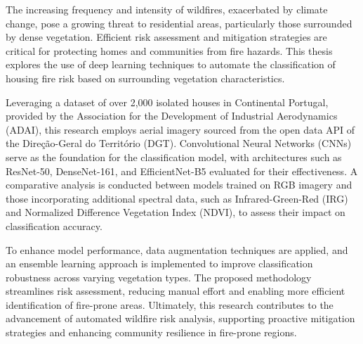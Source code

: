 
%
The increasing frequency and intensity of wildfires, exacerbated by climate change, 
pose a growing threat to residential areas, particularly those surrounded by 
dense vegetation. Efficient risk assessment and mitigation strategies are critical 
for protecting homes and communities from fire hazards. This thesis explores the 
use of deep learning techniques to automate the classification of housing fire 
risk based on surrounding vegetation characteristics.

Leveraging a dataset of over 2,000 isolated houses in Continental Portugal, 
provided by the Association for the Development of Industrial Aerodynamics 
(ADAI), this research employs aerial imagery sourced from the open data API 
of the Direção-Geral do Território (DGT). Convolutional Neural Networks (CNNs) 
serve as the foundation for the classification model, with architectures such as 
ResNet-50, DenseNet-161, and EfficientNet-B5 evaluated for their effectiveness. 
A comparative analysis is conducted between models trained on RGB imagery and 
those incorporating additional spectral data, such as Infrared-Green-Red (IRG) 
and Normalized Difference Vegetation Index (NDVI), to assess their impact on 
classification accuracy.

To enhance model performance, data augmentation techniques are applied, and an 
ensemble learning approach is implemented to improve classification robustness 
across varying vegetation types. The proposed methodology streamlines risk 
assessment, reducing manual effort and enabling more efficient identification 
of fire-prone areas. Ultimately, this research contributes to the advancement 
of automated wildfire risk analysis, supporting proactive mitigation strategies 
and enhancing community resilience in fire-prone regions.

